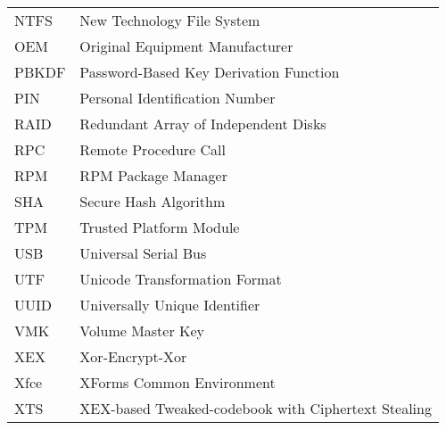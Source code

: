 \begin{longtable}{ll}
  NTFS & New Technology File System \\
  OEM & Original Equipment Manufacturer \\
  PBKDF & Password-Based Key Derivation Function \\
  PIN & Personal Identification Number \\
  RAID & Redundant Array of Independent Disks \\
  RPC & Remote Procedure Call \\
  RPM & RPM Package Manager \\
  SHA & Secure Hash Algorithm \\
  TPM & Trusted Platform Module \\
  USB & Universal Serial Bus \\
  UTF & Unicode Transformation Format \\
  UUID & Universally Unique Identifier \\
  VMK & Volume Master Key \\
  XEX & Xor-Encrypt-Xor \\
  Xfce & XForms Common Environment \\
  XTS & XEX-based Tweaked-codebook with Ciphertext Stealing \\
\end{longtable}

